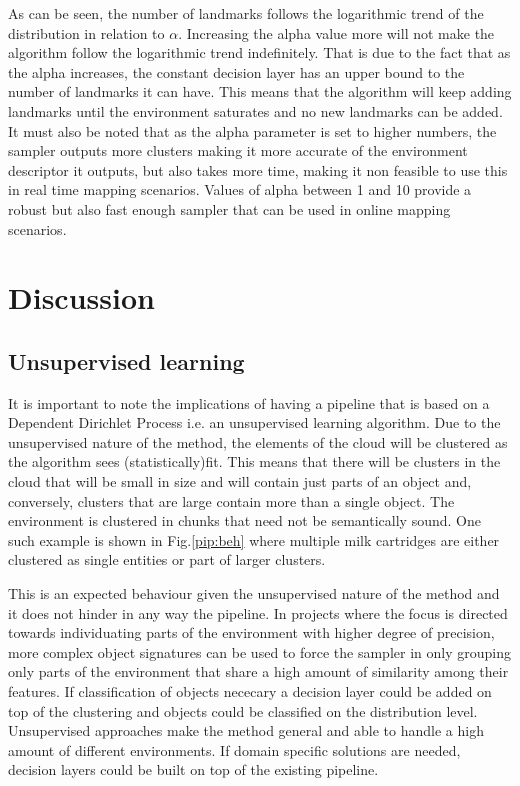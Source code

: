\documentclass[twoside,hidelinks]{article}
\begin{document}
As can be seen, the number of landmarks follows the logarithmic trend of the distribution in relation to $\alpha$. Increasing the alpha value more will not make the algorithm follow the logarithmic trend indefinitely. That is due to the fact that as the alpha increases, the constant decision layer has an upper bound to the number of landmarks it can have. This means that the algorithm will keep adding landmarks until the environment saturates and no new landmarks can be added. It must also be noted that as the alpha parameter is set to higher numbers, the sampler outputs more clusters making it more accurate of the environment descriptor it outputs, but also takes more time, making it non feasible to use this in real time mapping scenarios. Values of alpha between 1 and 10 provide a robust but also fast enough sampler that can be used in online mapping scenarios.



\newpage
\section{Discussion}
\label{sec:discussion}

    
\subsection{Unsupervised learning}


It is important to note the implications of having a pipeline that is based on a Dependent Dirichlet Process i.e. an unsupervised learning algorithm. Due to the unsupervised nature of the method, the elements of the cloud will be clustered as the algorithm sees (statistically)fit. This means that there will be clusters in the cloud that will be small in size and will contain just parts of an object and, conversely, clusters that are large contain more than a single object. The environment is clustered in chunks that need not be semantically sound. One such example is shown in Fig.\ref{pip:beh} where multiple milk cartridges are either clustered as single entities or part of larger clusters.

This is an expected behaviour given the unsupervised nature of the method and it does not hinder in any way the  pipeline. In projects where the focus is directed towards individuating parts of the environment with higher degree of precision, more complex object signatures can be used to force the sampler in only grouping only parts of the environment that share a high amount of similarity among their features. If classification of objects nececary a decision layer could be added on top of the clustering and objects could be classified on the distribution level. Unsupervised approaches make the method general and able to handle a high amount of different environments. If domain specific solutions are needed, decision layers could be built on top of the existing pipeline.
\end{document}
